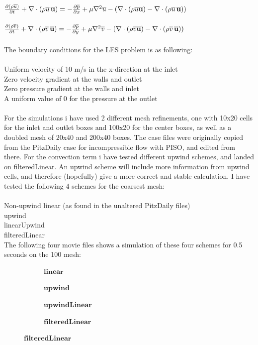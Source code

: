 \documentclass[a4paper,english,11pt,twoside]{article}
\begin{document}
\\
$\frac{\partial (\rho \overline{u})}{\partial t} + \nabla\cdot(\rho \overline{u}\, \mathbf{\overline{u}}) = -\frac{\partial \overline{p}}{\partial x} + \mu\nabla^2\overline{u} - (\nabla\cdot(\rho \overline{u\mathbf{u}}) - \nabla\cdot(\rho \overline{u}\, \mathbf{\overline{u}}))$\\
\\
$\frac{\partial (\rho \overline{v})}{\partial t} + \nabla\cdot(\rho \overline{v}\, \mathbf{\overline{u}}) = -\frac{\partial \overline{p}}{\partial y} + \mu\nabla^2\overline{v} - (\nabla\cdot(\rho \overline{v\mathbf{u}}) - \nabla\cdot(\rho \overline{v}\, \mathbf{\overline{u}}))$\\
\\
The boundary conditions for the LES problem is as following:\\
\\
Uniform velocity of 10 m/s in the x-direction at the inlet\\
Zero velocity gradient at the walls and outlet\\
Zero pressure gradient at the walls and inlet\\
A uniform value of 0 for the pressure at the outlet\\
\\
For the simulations i have used 2 different mesh refinements, one with 10x20 cells for the inlet and outlet boxes and 100x20 for the center boxes, as well as a doubled mesh of 20x40 and 200x40 boxes. The case files were originally copied from the PitzDaily case for incompressible flow with PISO, and edited from there. For the convection term i have tested different upwind schemes, and landed on filteredLinear. An upwind scheme will include more information from upwind cells, and therefore (hopefully) give a more correct and stable calculation. I have tested the following 4 schemes for the coarsest mesh:\\
\\
Non-upwind linear (as found in the unaltered PitzDaily files)\\
upwind\\
linearUpwind\\
filteredLinear\\
\newpage
The following four movie files shows a simulation of these four schemes for 0.5 seconds on the 100 mesh:\\
\begin{figure}[h!]
	\begin{subfigure}{0.2\textwidth}
		\caption{$\mathbf{linear}$}
 	\end{subfigure}
	\begin{subfigure}{0.2\textwidth}
		\caption{$\mathbf{upwind}$}
 	\end{subfigure}
	\begin{subfigure}{0.2\textwidth}
		\caption{$\mathbf{upwindLinear}$}
 	\end{subfigure}
	\begin{subfigure}{0.2\textwidth}
		\caption{$\mathbf{filteredLinear}$}
 	\end{subfigure}
\end{figure}
\end{document}
